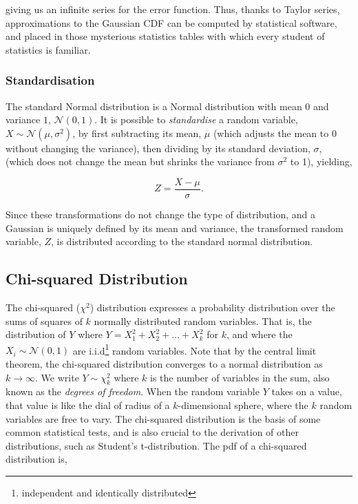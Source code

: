 \documentclass[11pt]{amsart}
\begin{document}
giving us an infinite series for the error function. Thus, thanks to Taylor series, approximations to the Gaussian CDF can be computed by statistical software, and placed in those mysterious statistics tables with which every student of statistics is familiar.

\subsubsection{Standardisation}

The standard Normal distribution is a Normal distribution with mean $0$ and variance $1$, $\mathcal{N}(0, 1)$. It is possible to \emph{standardise} a random variable, $X \sim \mathcal{N}(\mu, \sigma^2)$, by first subtracting its mean, $\mu$ (which adjusts the mean to 0 without changing the variance), then dividing by its standard deviation, $\sigma$, (which does not change the mean but shrinks the variance from $\sigma^2$ to 1), yielding,

$$Z = \frac{X - \mu}{\sigma}.$$

Since these transformations do not change the type of distribution, and a Gaussian is uniquely defined by its mean and variance, the transformed random variable, $Z$, is distributed according to the standard normal distribution.

\subsection{Chi-squared Distribution}

The chi-squared ($\chi^2$) distribution expresses a probability distribution over the sums of squares of $k$ normally distributed random variables. That is, the distribution of $Y$ where $Y = X_1^2 + X_2^2 + \dots + X_k^2$ for $k$, and where the $X_i \sim \mathcal{N}(0, 1)$ are i.i.d\footnote{independent and identically distributed} random variables. Note that by the central limit theorem, the chi-squared distribution converges to a normal distribution as $k \to \infty$. We write $Y \sim \chi^2_k$ where $k$ is the number of variables in the sum, also known as the \emph{degrees of freedom}. When the random variable $Y$ takes on a value, that value is like the dial of radius of a $k$-dimensional sphere, where the $k$ random variables are free to vary. The chi-squared distribution is the basis of some common statistical tests, and is also crucial to the derivation of other distributions, such as Student's t-distribution. The pdf of a chi-squared distribution is,
\end{document}
